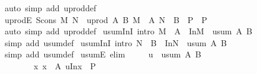 \begin{isabellebody}
%
\endisadelimproof
%
\isatagproof
{}\isamarkupfalse%
\ {\isacharparenleft}auto\ simp\ add{\isacharcolon}\ uprod{\isacharunderscore}def{\isacharparenright}%
\endisatagproof
{\isafoldproof}%
%
\isadelimproof
\ \isanewline
%
\endisadelimproof
\isanewline
\isanewline
\isanewline
{}\isamarkupfalse%
\ uprodE{}{\isacharcolon}\ {\isachardoublequoteopen}{\isasymlbrakk}Scons\ M\ N\ {\isasymin}\ uprod\ A\ B{\isacharsemicolon}\ {\isasymlbrakk}M\ {\isasymin}\ A{\isacharsemicolon}\ N\ {\isasymin}\ B{\isasymrbrakk}\ {\isasymLongrightarrow}\ P{\isasymrbrakk}\ {\isasymLongrightarrow}\ P{\isachardoublequoteclose}\isanewline
%
\isadelimproof
%
\endisadelimproof
%
\isatagproof
{}\isamarkupfalse%
\ {\isacharparenleft}auto\ simp\ add{\isacharcolon}\ uprod{\isacharunderscore}def{\isacharparenright}%
\endisatagproof
{\isafoldproof}%
%
\isadelimproof
\isanewline
%
\endisadelimproof
\isanewline
\isanewline
\isanewline
\isanewline
{}\isamarkupfalse%
\ usum{\isacharunderscore}In{}I\ {\isacharbrackleft}intro{\isacharbrackright}{\isacharcolon}\ {\isachardoublequoteopen}M\ {\isasymin}\ A\ {\isasymLongrightarrow}\ In{}{\isacharparenleft}M{\isacharparenright}\ {\isasymin}\ usum\ A\ B{\isachardoublequoteclose}\isanewline
%
\isadelimproof
%
\endisadelimproof
%
\isatagproof
{}\isamarkupfalse%
\ {\isacharparenleft}simp\ add{\isacharcolon}\ usum{\isacharunderscore}def{\isacharparenright}%
\endisatagproof
{\isafoldproof}%
%
\isadelimproof
\isanewline
%
\endisadelimproof
\isanewline
{}\isamarkupfalse%
\ usum{\isacharunderscore}In{}I\ {\isacharbrackleft}intro{\isacharbrackright}{\isacharcolon}\ {\isachardoublequoteopen}N\ {\isasymin}\ B\ {\isasymLongrightarrow}\ In{}{\isacharparenleft}N{\isacharparenright}\ {\isasymin}\ usum\ A\ B{\isachardoublequoteclose}\isanewline
%
\isadelimproof
%
\endisadelimproof
%
\isatagproof
{}\isamarkupfalse%
\ {\isacharparenleft}simp\ add{\isacharcolon}\ usum{\isacharunderscore}def{\isacharparenright}%
\endisatagproof
{\isafoldproof}%
%
\isadelimproof
\isanewline
%
\endisadelimproof
\isanewline
{}\isamarkupfalse%
\ usumE\ {\isacharbrackleft}elim{\isacharbang}{\isacharbrackright}{\isacharcolon}\ \isanewline
\ \ \ \ {\isachardoublequoteopen}{\isasymlbrakk}u\ {\isasymin}\ usum\ A\ B{\isacharsemicolon}\ \ \ \isanewline
\ \ \ \ \ \ \ \ {\isasymAnd}x{\isachardot}\ {\isasymlbrakk}x\ {\isasymin}\ A{\isacharsemicolon}\ u{\isacharequal}In{}{\isacharparenleft}x{\isacharparenright}{\isasymrbrakk}\ {\isasymLongrightarrow}\ P{\isacharsemicolon}\ \ \isanewline

\end{isabellebody}
